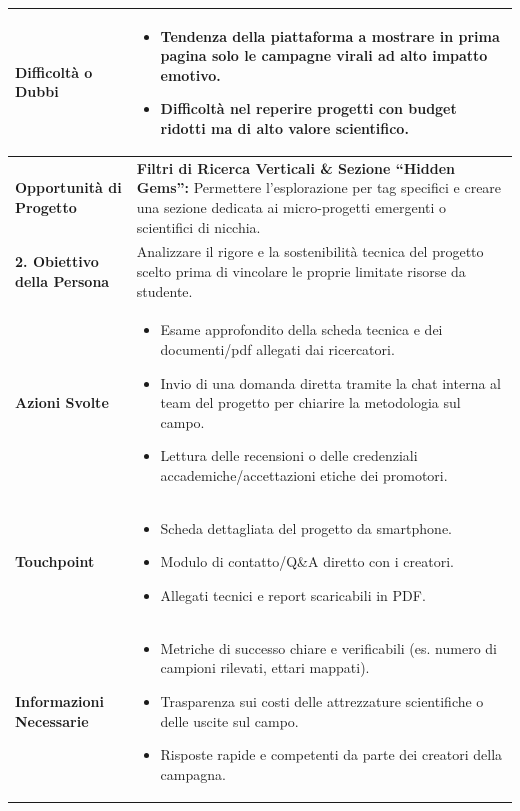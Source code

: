 \documentclass[11pt,a4paper]{article}
\begin{document}
\begin{table}[h!]
\begin{tabular}{|p{3.2cm}|p{11.8cm}|}
\textbf{Difficoltà o Dubbi} &
\begin{itemize}[leftmargin=*,nosep]
    \item Tendenza della piattaforma a mostrare in prima pagina solo le campagne virali ad alto impatto emotivo.
    \item Difficoltà nel reperire progetti con budget ridotti ma di alto valore scientifico.
\end{itemize} \\ \hline
\textbf{Opportunità di Progetto} &
\textbf{Filtri di Ricerca Verticali \& Sezione ``Hidden Gems'':} Permettere l'esplorazione per tag specifici e creare una sezione dedicata ai micro-progetti emergenti o scientifici di nicchia. \\ \hline
\hline
\textbf{2. Obiettivo della Persona} & Analizzare il rigore e la sostenibilità tecnica del progetto scelto prima di vincolare le proprie limitate risorse da studente. \\ \hline
\textbf{Azioni Svolte} &
\begin{itemize}[leftmargin=*,nosep]
    \item Esame approfondito della scheda tecnica e dei documenti/pdf allegati dai ricercatori.
    \item Invio di una domanda diretta tramite la chat interna al team del progetto per chiarire la metodologia sul campo.
    \item Lettura delle recensioni o delle credenziali accademiche/accettazioni etiche dei promotori.
\end{itemize} \\ \hline
\textbf{Touchpoint} &
\begin{itemize}[leftmargin=*,nosep]
    \item Scheda dettagliata del progetto da smartphone.
    \item Modulo di contatto/Q\&A diretto con i creatori.
    \item Allegati tecnici e report scaricabili in PDF.
\end{itemize} \\ \hline
\textbf{Informazioni Necessarie} &
\begin{itemize}[leftmargin=*,nosep]
    \item Metriche di successo chiare e verificabili (es. numero di campioni rilevati, ettari mappati).
    \item Trasparenza sui costi delle attrezzature scientifiche o delle uscite sul campo.
    \item Risposte rapide e competenti da parte dei creatori della campagna.

\end{itemize}
\end{tabular}
\end{table}
\end{document}

